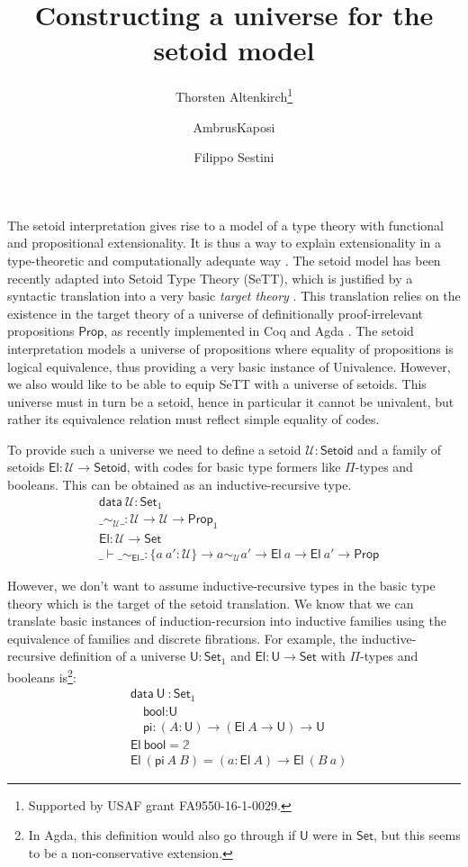 \documentclass{easychair}
\title{Constructing a universe for the setoid model}
\author{Thorsten Altenkirch\inst{1}\thanks{Supported by USAF grant
    FA9550-16-1-0029.} \and AmbrusKaposi \inst{2} \and Filippo Sestini\inst{1}}
\institute{
  School of Computer Science, University of Nottingham, UK\\
  \email{\{psztxa,psxfs5\}@nottingham.ac.uk}
  \and
  E{\"o}tv{\"o}s Lor{\'a}nd University, Budapest, Hungary\\
  \email{akaposi@inf.elte.hu}
}
\newcommand{\setoidU}{\mathcal{U}}
\newcommand{\Set}{\textsf{Set}}
\newcommand{\Prop}{\textsf{Prop}}
\newcommand{\Setoid}{\textsf{Setoid}}
\newcommand{\U}{\textsf{U}}
\newcommand{\El}{\textsf{El}}
\providecommand\mathbbm{\mathbb}
\begin{document}
\maketitle

The setoid interpretation gives rise to a model of a type theory with functional
and propositional extensionality. It is thus a way to explain extensionality in
a type-theoretic and computationally adequate way \cite{setoid-model}. The
setoid model has been recently adapted into Setoid Type Theory (SeTT), which is
justified by a syntactic translation into a very basic \emph{target theory}
\cite{mpc19}. This translation relies on the existence in the target theory of a
universe of definitionally proof-irrelevant propositions $\Prop$, as recently
implemented in Coq and Agda \cite{gilbert}. The setoid interpretation models a
universe of propositions where equality of propositions is logical equivalence,
thus providing a very basic instance of Univalence. However, we also would like
to be able to equip SeTT with a universe of setoids. This universe must in turn
be a setoid, hence in particular it cannot be univalent, but rather its
equivalence relation must reflect simple equality of codes.

To provide such a universe we need to define a setoid $\setoidU : \Setoid$ and a
family of setoids $\El : \setoidU \to \Setoid$, with codes for basic type
formers like $\Pi$-types and booleans. This can be obtained as an inductive-recursive type.
%
\begin{align*}
  & \textsf{data} \ \setoidU : \Set_1 \\
  & \_\sim_\setoidU\_ : \setoidU \to \setoidU \to \Prop_1 \\
  & \El : \setoidU \to \Set \\
  & \_\vdash\_\sim_\El\_ : \{a\ a' : \setoidU\} \to a \sim_\setoidU a' \to \El\ a \to \El\ a' \to \Prop
\end{align*}

However, we don't want to assume inductive-recursive types in the basic type
theory which is the target of the setoid translation. We know that we can translate
basic instances of induction-recursion into inductive families using the
equivalence of families and discrete fibrations. For example, the
inductive-recursive definition of a universe $\U:\Set_1$ and $\El : \U \to
\Set$ with $\Pi$-types and booleans is\footnote{In Agda, this definition would also go through if $\U$ were in $\Set$, but
  this seems to be a non-conservative extension.}:
%
\begin{align*}
  & \textsf{data}\ \U\ : \Set_1 \\
  & \quad \textsf{bool} : \U \\
  & \quad \textsf{pi} : (A : \U) \to (\El\ A \to \U) \to \U \\
  & \El\ \textsf{bool} = \mathbbm{2} \\
  & \El\ (\textsf{pi}\ A\ B) = (a : \El\ A) \to \El\ (B\ a)
\end{align*}
\end{document}
